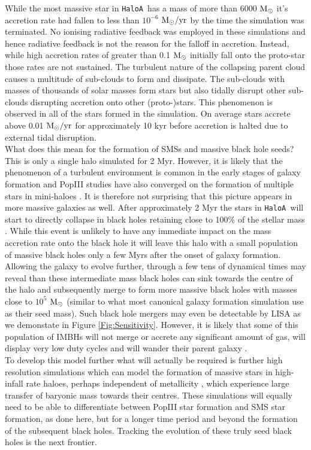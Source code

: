 \documentclass[graphics, twocolumn, usenatbib]{mn2e}
\newcommand{\msolar} {$\rm{M_{\odot}}~$}
\newcommand{\msolaryr} {$\rm{M_{\odot}/yr}~$}
\newcommand{\ha} {\texttt{HaloA~}}
\begin{document}
While the most massive star in \ha has a mass of more than 6000 \msolar it's accretion rate had fallen
to less than $10^{-6}$ \msolaryr by the time the simulation was terminated. No ionising radiative
feedback was employed in these simulations and hence radiative feedback is not the reason for
the falloff in accretion. Instead, while high accretion rates of greater than 0.1 \msolar initially
fall onto the proto-star those rates are not sustained. The turbulent nature of the collapsing parent
cloud causes a multitude of sub-clouds to form and dissipate. The sub-clouds with masses of
thousands of solar masses form stars but also tidally disrupt other sub-clouds disrupting
accretion onto other (proto-)stars. This phenomenon is observed in all of the stars formed in the simulation.
On average stars accrete above 0.01 \msolaryr for approximately 10 kyr before accretion is halted
due to external tidal disruption. \\
\indent What does this mean for the formation of SMSs and massive black hole seeds? This is only a
single halo simulated for 2 Myr. However, it is likely that the phenomenon of a turbulent environment is common in the early stages of galaxy formation and PopIII studies have also converged on the
formation of multiple stars in mini-haloes \citep[e.g.][]{Turk_2012}. It is therefore not surprising that this picture appears in
more massive galaxies as well. After approximately 2 Myr the stars in \ha will start to directly
collapse in black holes retaining close to 100\% of the stellar mass \citep{Heger_2003}. While this
event is unlikely to have any immediate impact on the mass accretion rate onto the black hole it will
leave this halo with a small population of massive black holes only a few Myrs after the onset of galaxy formation. Allowing the galaxy to evolve further, through a few tens of dynamical times may
reveal than these intermediate mass black holes can sink towards the centre of the halo and subsequently merge to form more massive black holes with masses close to $10^5$ \msolar (similar to what most canonical galaxy formation
simulation use as their seed mass). Such black hole mergers may even be
detectable by LISA as we demonstate in Figure \ref{Fig:Sensitivity}. However, it is likely that some of this population of IMBHs will not merge or accrete any significant amount of gas, will display very low duty cycles and will wander their parent galaxy \citep{Tremmel_2018, Reines_2020, Barausse_2020}.\\
\indent To develop this model further what will actually be required is further high
resolution simulations which can model the formation of massive stars in high-infall rate haloes,
perhaps independent of metallicity \citep[][Regan et al. 2020]{Chon_2020}, which experience
large transfer of baryonic mass towards their centres. These simulations will equally need to
be able to differentiate between PopIII star formation and SMS star formation, as done here, but
for a longer time period and beyond the formation of the subsequent black holes.
Tracking the evolution of these truly seed black holes is the next frontier. 
\end{document}
